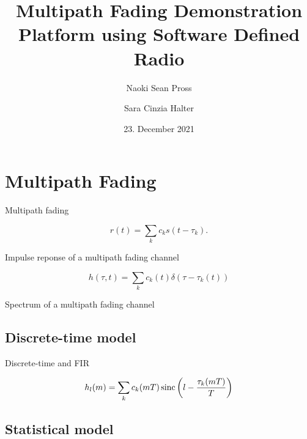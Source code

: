 \documentclass[xetex, onlymath, handout]{beamer}
\title{Multipath Fading Demonstration Platform using Software Defined Radio}
\author{Naoki Sean Pross \and Sara Cinzia Halter}
\date{23. December 2021}
\institute[OST]{OST FHO Campus Rapperswil}
\begin{document}
\frame{
  \maketitle
}

\section{Multipath Fading}

\begin{frame}{Multipath fading}
	\begin{figure}
		\centering
		
	\end{figure}
  \vspace{\baselineskip}
  \[
    r(t) = \sum_k c_k s(t - \tau_k).
  \]
\end{frame}

\begin{frame}[fragile]{Impulse reponse of a multipath fading channel}
  \begin{figure}
    \centering
    
  \end{figure}
  \[
		h(\tau, t) = \sum_k c_k(t) \delta(\tau - \tau_k(t))
  \]
\end{frame}

\begin{frame}[fragile]{Spectrum of a multipath fading channel}
	\begin{figure}
		\centering
		\resizebox{\linewidth}{!}{
			
		}
	\end{figure}
\end{frame}

\subsection{Discrete-time model}

\begin{frame}[fragile]{Discrete-time and FIR}
	\begin{figure}
		\centering
    \resizebox{\linewidth}{!}{
      
    }
	\end{figure}
  \vspace{\baselineskip}
  \[
    h_l(m) = \sum_k c_k(mT) \operatorname{sinc}\left(l - \frac{\tau_k(mT)}{T}\right)
  \]
\end{frame}

\subsection{Statistical model}
\end{document}

